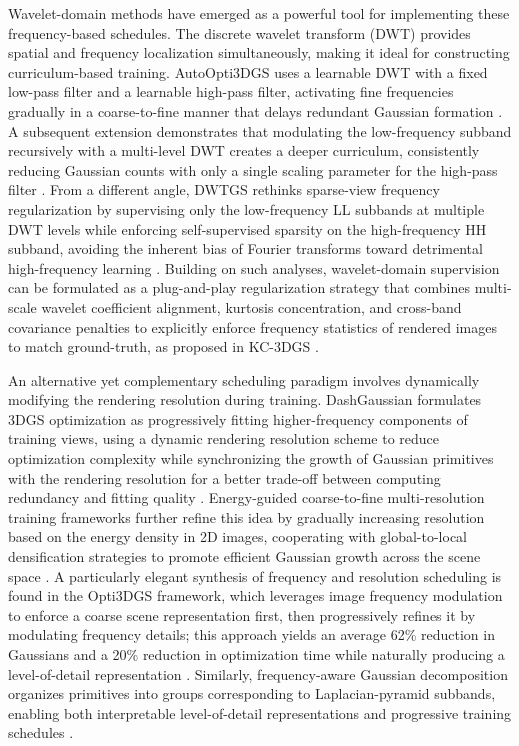 \documentclass[11pt]{article}
\begin{document}
Wavelet-domain methods have emerged as a powerful tool for implementing these frequency-based schedules. The discrete wavelet transform (DWT) provides spatial and frequency localization simultaneously, making it ideal for constructing curriculum-based training. AutoOpti3DGS uses a learnable DWT with a fixed low-pass filter and a learnable high-pass filter, activating fine frequencies gradually in a coarse-to-fine manner that delays redundant Gaussian formation \cite{ref141}. A subsequent extension demonstrates that modulating the low-frequency subband recursively with a multi-level DWT creates a deeper curriculum, consistently reducing Gaussian counts with only a single scaling parameter for the high-pass filter \cite{ref78}. From a different angle, DWTGS rethinks sparse-view frequency regularization by supervising only the low-frequency LL subbands at multiple DWT levels while enforcing self-supervised sparsity on the high-frequency HH subband, avoiding the inherent bias of Fourier transforms toward detrimental high-frequency learning \cite{ref77}. Building on such analyses, wavelet-domain supervision can be formulated as a plug-and-play regularization strategy that combines multi-scale wavelet coefficient alignment, kurtosis concentration, and cross-band covariance penalties to explicitly enforce frequency statistics of rendered images to match ground-truth, as proposed in KC-3DGS \cite{ref76}.

An alternative yet complementary scheduling paradigm involves dynamically modifying the rendering resolution during training. DashGaussian formulates 3DGS optimization as progressively fitting higher-frequency components of training views, using a dynamic rendering resolution scheme to reduce optimization complexity while synchronizing the growth of Gaussian primitives with the rendering resolution for a better trade-off between computing redundancy and fitting quality \cite{ref142}. Energy-guided coarse-to-fine multi-resolution training frameworks further refine this idea by gradually increasing resolution based on the energy density in 2D images, cooperating with global-to-local densification strategies to promote efficient Gaussian growth across the scene space \cite{ref143}. A particularly elegant synthesis of frequency and resolution scheduling is found in the Opti3DGS framework, which leverages image frequency modulation to enforce a coarse scene representation first, then progressively refines it by modulating frequency details; this approach yields an average 62\% reduction in Gaussians and a 20\% reduction in optimization time while naturally producing a level-of-detail representation \cite{ref144}. Similarly, frequency-aware Gaussian decomposition organizes primitives into groups corresponding to Laplacian-pyramid subbands, enabling both interpretable level-of-detail representations and progressive training schedules \cite{ref145}.
\end{document}

